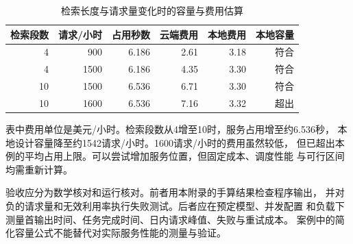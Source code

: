 \begin{table}[htbp]
\centering\small
\caption{检索长度与请求量变化时的容量与费用估算}
\begin{tabular}{rrrrrr}
\toprule
\rowcolor{BDMTableHead}
检索段数 & 请求/小时 & 占用秒数 & 云端费用 & 本地费用 & 本地容量\\
\midrule
4 & 900 & 6.186 & 2.61 & 3.18 & 符合\\
4 & 1500 & 6.186 & 4.35 & 3.30 & 符合\\
10 & 1500 & 6.536 & 6.71 & 3.30 & 符合\\
10 & 1600 & 6.536 & 7.16 & 3.32 & 超出\\
\bottomrule
\end{tabular}
\end{table}
表中费用单位是美元/小时。检索段数从4增至10时，服务占用增至约6.536秒，
本地设计容量降至约1542请求/小时。1600请求/小时的费用虽然较低，
但已超出本例的平均占用上限。可以尝试增加服务位置，但固定成本、调度性能
与可行区间均需重新计算。

验收应分为数学核对和运行核对。前者用本附录的手算结果检查程序输出，
并对负的请求量和无效利用率执行失败测试。后者应在预定模型、并发配置
和负载下测量首输出时间、任务完成时间、日内请求峰值、失败与重试成本。
案例中的简化容量公式不能替代对实际服务性能的测量与验证。
